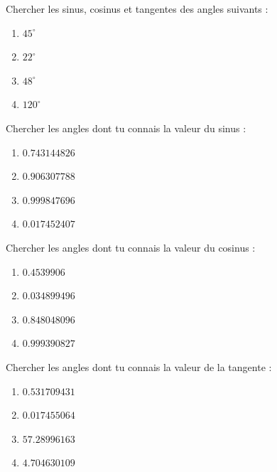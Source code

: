\begin{exercice}
Chercher les sinus, cosinus et tangentes des angles suivants :
\begin{multicols}{2}
 \begin{enumerate}
 \item $45^\circ$
 \item $22^\circ$
 \item $48^\circ$
 \item $120^\circ$
 \end{enumerate}
\end{multicols}
\end{exercice}

\begin{exercice}
Chercher les angles dont tu connais la valeur du sinus :
\begin{multicols}{2}
\begin{enumerate} 
\item $0.743144826$
\item $0.906307788$
\item $0.999847696$
\item $0.017452407$
\end{enumerate}
\end{multicols}
\end{exercice}

\begin{exercice}
Chercher les angles dont tu connais la valeur du cosinus :
\begin{multicols}{2}
\begin{enumerate}
\item $0.4539906$
\item $0.034899496$
\item $0.848048096$
\item $0.999390827$
\end{enumerate}
\end{multicols}
\end{exercice}

\begin{exercice}
Chercher les angles dont tu connais la valeur de la tangente :
\begin{multicols}{2}
\begin{enumerate}
\item $0.531709431$
\item $0.017455064$
\item $57.28996163$
\item $4.704630109$
\end{enumerate}
\end{multicols}
\end{exercice}

